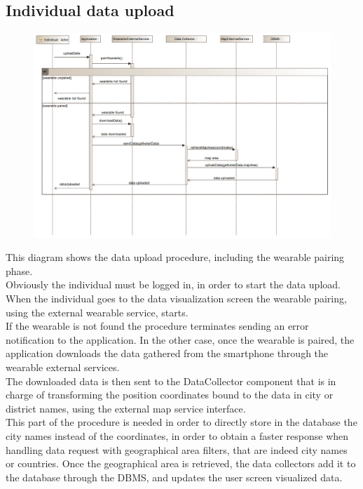 \subsection{Individual data upload}
\begin{figure}[H]
\centering
\includegraphics[width=\linewidth]{resources/uml/sequence/wearablePairing.png}
\end{figure}
This diagram shows the data upload procedure, including the wearable pairing phase.\\
Obviously the individual must be logged in, in order to start the data upload.\\
When the individual goes to the data visualization screen the wearable pairing, using the external wearable service, starts.\\
If the wearable is not found the procedure terminates sending an error notification to the application.
In the other case, once the wearable is paired, the application downloads the data gathered from the smartphone through the wearable external services.\\
The downloaded data is then sent to the DataCollector component that is in charge of transforming the position coordinates bound to the data in city or district names, using the external map service interface.\\
This part of the procedure is needed in order to directly store in the database the city names instead of the coordinates, in order to obtain a faster response when handling data request with geographical area filters, that are indeed city names or countries.
Once the geographical area is retrieved, the data collectors add it to the database through the DBMS, and updates the user screen visualized data.

